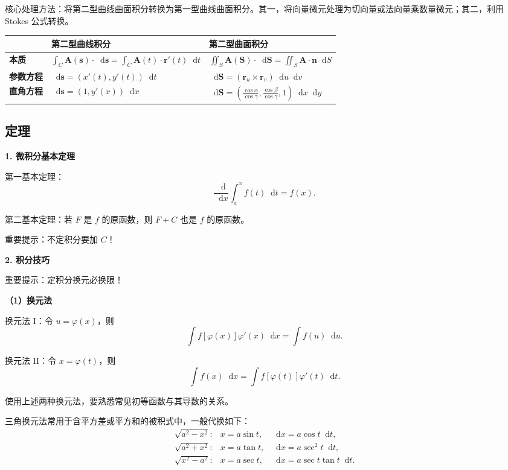 \documentclass[UTF8,fontset=fandol,zihao=5]{ctexart}
\newcommand{\dd}{\mathop{}\!\mathrm{d}}
\begin{document}
核心处理方法：将第二型曲线曲面积分转换为第一型曲线曲面积分。其一，将向量微元处理为切向量或法向量乘数量微元；其二，利用 Stokes 公式转换。

\begin{center}
\begin{tabularx}{\textwidth}{>{\bfseries}p{2.1cm}XX}
\toprule
 & 第二型曲线积分 & 第二型曲面积分 \\
\midrule
本质 & $\displaystyle\int_C\bm A(\bm s)\cdot\dd\bm s=\int_C\bm A(t)\cdot\bm r'(t)\dd t$ & $\displaystyle\iint_S\bm A(\bm S)\cdot\dd\bm S=\iint_S\bm A\cdot\bm n\dd S$ \\
参数方程 & $\dd\bm s=(x'(t),y'(t))\dd t$ & $\dd\bm S=(\bm r_u\times\bm r_v)\dd u\dd v$ \\
直角方程 & $\dd\bm s=(1,y'(x))\dd x$ & $\displaystyle\dd\bm S=\left(\frac{\cos\alpha}{\cos\gamma},\frac{\cos\beta}{\cos\gamma},1\right)\dd x\dd y$ \\
\bottomrule
\end{tabularx}
\end{center}

\subsection{定理}

\textbf{1. 微积分基本定理}

第一基本定理：
\[
\frac{\dd}{\dd x}\int_a^x f(t)\dd t=f(x).
\]

第二基本定理：若 $F$ 是 $f$ 的原函数，则 $F+C$ 也是 $f$ 的原函数。

重要提示：不定积分要加 $C$！

\textbf{2. 积分技巧}

重要提示：定积分换元必换限！

\textbf{（1）换元法}

换元法 I：令 $u=\varphi(x)$，则
\[
\int f[\varphi(x)]\varphi'(x)\dd x=\int f(u)\dd u.
\]

换元法 II：令 $x=\varphi(t)$，则
\[
\int f(x)\dd x=\int f[\varphi(t)]\varphi'(t)\dd t.
\]

使用上述两种换元法，要熟悉常见初等函数与其导数的关系。

三角换元法常用于含平方差或平方和的被积式中，一般代换如下：
\[
\begin{array}{lll}
\sqrt{a^2-x^2}:&x=a\sin t,&\dd x=a\cos t\dd t,\\
\sqrt{a^2+x^2}:&x=a\tan t,&\dd x=a\sec^2t\dd t,\\
\sqrt{x^2-a^2}:&x=a\sec t,&\dd x=a\sec t\tan t\dd t.
\end{array}
\]
\end{document}
